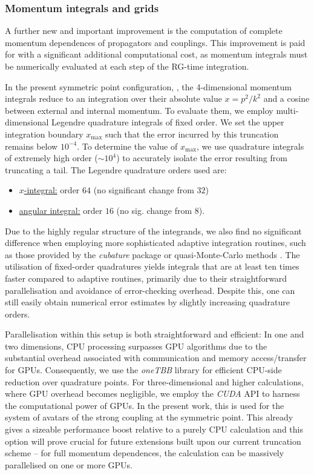 \documentclass[aps,twocolumn,prd,superscriptaddress]{revtex4-2}
\begin{document}
\subsubsection{Momentum integrals and grids}
\label{sec:momentumIntegration}

A further new and important improvement is the computation of complete momentum dependences of propagators and couplings. This improvement is paid for with a significant additional computational cost, as momentum integrals must be numerically evaluated at each step of the RG-time integration.

In the present symmetric point configuration, , the 4-dimensional momentum integrals reduce to an integration over their absolute value $x = p^2 / k^2$ and a cosine between external and internal momentum.
To evaluate them, we employ multi-dimensional Legendre quadrature integrals of fixed order. We set the upper integration boundary $x_\mathrm{max}$ such that the error incurred by this truncation remains below $10^{-4}$. To determine the value of $x_\mathrm{max}$, we use quadrature integrals of extremely high order ($\sim 10^4$) to accurately isolate the error resulting from truncating a tail.
The Legendre quadrature orders used are:
%
\begin{itemize}
	\item \underline{$x$-integral:} order $64$ (no significant change from $32$)
	\item \underline{angular integral:} order $16$ (no sig. change from $8$).
\end{itemize}
%
Due to the highly regular structure of the integrands, we also find no significant difference when employing more sophisticated adaptive integration routines, such as those provided by the \textit{cubature} \cite{cubature} package or quasi-Monte-Carlo methods \cite{Borowka:2018goh}. The utilisation of fixed-order quadratures yields integrals that are at least ten times faster compared to adaptive routines, primarily due to their straightforward parallelisation and avoidance of error-checking overhead. Despite this, one can still easily obtain numerical error estimates by slightly increasing quadrature orders.

Parallelisation within this setup is both straightforward and efficient: In one and two dimensions, CPU processing surpasses GPU algorithms due to the substantial overhead associated with communication and memory access/transfer for GPUs. Consequently, we use the \textit{oneTBB} library for efficient CPU-side reduction over quadrature points. For three-dimensional and higher calculations, where GPU overhead becomes negligible, we employ the \textit{CUDA} API to harness the computational power of GPUs. In the present work, this is used for the system of avatars of the strong coupling at the symmetric point. This already gives a sizeable performance boost relative to a purely CPU calculation and this option will prove crucial for future extensions built upon our current truncation scheme -- for full momentum dependences, the calculation can be massively parallelised on one or more GPUs.
\end{document}
